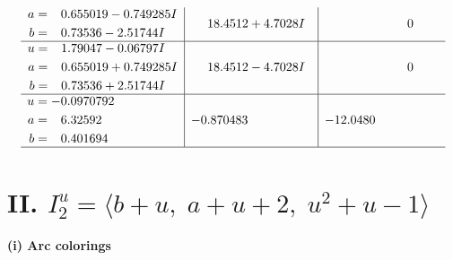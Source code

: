 \documentclass[1p]{elsarticle_modified}
\theoremstyle{definition}
\begin{document}
$$\begin{array}{c|c|c}
\begin{aligned}
a &= \phantom{-}0.655019 - 0.749285 I \\
b &= \phantom{-}0.73536 - 2.51744 I\end{aligned}
 & \phantom{-}18.4512 + 4.7028 I & \phantom{-0.000000 } 0 \\ \hline\begin{aligned}
u &= \phantom{-}1.79047 - 0.06797 I \\
a &= \phantom{-}0.655019 + 0.749285 I \\
b &= \phantom{-}0.73536 + 2.51744 I\end{aligned}
 & \phantom{-}18.4512 - 4.7028 I & \phantom{-0.000000 } 0 \\ \hline\begin{aligned}
u &= -0.0970792\phantom{ +0.000000I} \\
a &= \phantom{-}6.32592\phantom{ +0.000000I} \\
b &= \phantom{-}0.401694\phantom{ +0.000000I}\end{aligned}
 & -0.870483\phantom{ +0.000000I} & -12.0480\phantom{ +0.000000I}\\
 \hline 
 \end{array}$$\newpage\newpage\renewcommand{\arraystretch}{1}
\centering \section*{II. $I^u_{2}= \langle b+u,\;a+u+2,\;u^2+u-1 \rangle$}
\flushleft \textbf{(i) Arc colorings}\\
\end{document}
